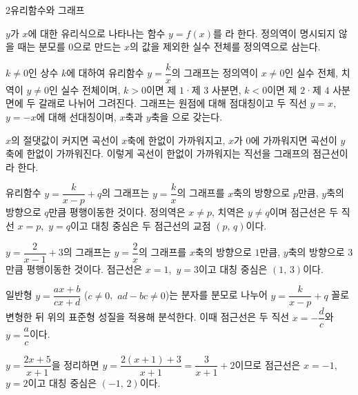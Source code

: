 \documentclass[10pt]{article}
\begin{document}
\begin{dmconcept}{2}{유리함수와 그래프}
\setlength{\parskip}{1.0mm plus 1.1mm minus 0mm}\linespread{1.16}\selectfont%


$y$가 $x$에 대한 유리식으로 나타나는 함수 $y = f(x)$를 라 한다. 정의역이 명시되지 않을 때는 분모를 $0$으로 만드는 $x$의 값을 제외한 실수 전체를 정의역으로 삼는다.


$k \ne 0$인 상수 $k$에 대하여 유리함수 $y = \dfrac{k}{x}$의 그래프는 정의역이 $x \ne 0$인 실수 전체, 치역이 $y \ne 0$인 실수 전체이며, $k > 0$이면 제 $1$·제 $3$ 사분면, $k < 0$이면 제 $2$·제 $4$ 사분면에 두 갈래로 나뉘어 그려진다. 그래프는 원점에 대해 점대칭이고 두 직선 $y = x$,\ $y = -x$에 대해 선대칭이며, $x$축과 $y$축을 으로 갖는다.

$x$의 절댓값이 커지면 곡선이 $x$축에 한없이 가까워지고, $x$가 $0$에 가까워지면 곡선이 $y$축에 한없이 가까워진다. 이렇게 곡선이 한없이 가까워지는 직선을 그래프의 점근선이라 한다.


유리함수 $y = \dfrac{k}{x - p} + q$의 그래프는 $y = \dfrac{k}{x}$의 그래프를 $x$축의 방향으로 $p$만큼, $y$축의 방향으로 $q$만큼 평행이동한 것이다. 정의역은 $x \ne p$, 치역은 $y \ne q$이며 점근선은 두 직선 $x = p$,\ $y = q$이고 대칭 중심은 두 점근선의 교점 $(p,\, q)$이다.

\begin{dmexample}
$y = \dfrac{2}{x - 1} + 3$의 그래프는 $y = \dfrac{2}{x}$의 그래프를 $x$축의 방향으로 $1$만큼, $y$축의 방향으로 $3$만큼 평행이동한 것이다. 점근선은 $x = 1$,\ $y = 3$이고 대칭 중심은 $(1,\, 3)$이다.
\end{dmexample}


일반형 $y = \dfrac{ax + b}{cx + d}$ ($c \ne 0$,\ $ad - bc \ne 0$)는 분자를 분모로 나누어 $y = \dfrac{k}{x - p} + q$ 꼴로 변형한 뒤 위의 표준형 성질을 적용해 분석한다. 이때 점근선은 두 직선 $x = -\dfrac{d}{c}$와 $y = \dfrac{a}{c}$이다.

\begin{dmexample}
$y = \dfrac{2x + 5}{x + 1}$을 정리하면 $y = \dfrac{2(x + 1) + 3}{x + 1} = \dfrac{3}{x + 1} + 2$이므로 점근선은 $x = -1$,\ $y = 2$이고 대칭 중심은 $(-1,\, 2)$이다.
\end{dmexample}


\end{dmconcept}
\end{document}
